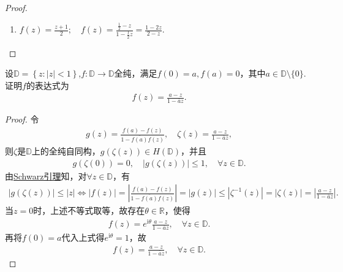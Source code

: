 \documentclass[../../main.tex]{subfiles}%
\begin{document}
\begin{proof}
\begin{enumerate}[(1)]
\item $f\left( z \right) =\frac{z+1}{2};\quad f\left( z \right) =\frac{\frac{1}{2}-z}{1-\frac{1}{2}z}=\frac{1-2z}{2-z}.$
\end{enumerate}

\end{proof}

\begin{example}
设$\mathbb{D} =\left\{ z:\left| z \right|<1 \right\}$,$f:\mathbb{D}\to\mathbb{D}$全纯，满足$f(0)=a,f(a)=0$，其中$a\in\mathbb{D}\setminus\{0\}$. 证明$f$的表达式为
\begin{align*}
f(z)=\frac{a-z}{1-\overline{a}z}.
\end{align*}
\end{example}
\begin{proof}

令
\begin{align*}
g\left( z \right) =\frac{f\left( a \right) -f\left( z \right)}{1-\overline{f\left( a \right) }f\left( z \right)},\quad \zeta \left( z \right) =\frac{a-z}{1-\overline{a}z},
\end{align*}
则$\zeta$是$\mathbb{D}$上的全纯自同构，$g\left( \zeta \left( z \right) \right) \in H\left( \mathbb{D} \right)$，并且
\begin{align*}
g\left( \zeta \left( 0 \right) \right) =0,\quad \left| g\left( \zeta \left( z \right) \right) \right|\leqslant 1,\quad \forall z\in \mathbb{D} .
\end{align*}
由\hyperref[theorem:Schwarz引理-定理4.5.3]{Schwarz引理}知，对$\forall z\in \mathbb{D}$，有
\begin{align*}
\left| g\left( \zeta \left( z \right) \right) \right|\leqslant \left| z \right|\Longleftrightarrow \left| f\left( z \right) \right|=\left| \frac{f\left( a \right) -f\left( z \right)}{1-\overline{f\left( a \right) }f\left( z \right)} \right|=\left| g\left( z \right) \right|\leqslant \left| \zeta ^{-1}\left( z \right) \right|=\left| \zeta \left( z \right) \right|=\left| \frac{a-z}{1-\overline{a}z} \right|.
\end{align*}
当$z=0$时，上述不等式取等，故存在$\theta \in \mathbb{R}$，使得
\begin{align*}
f\left( z \right) =e^{\mathrm{i}\theta}\frac{a-z}{1-\overline{a}z},\quad \forall z\in \mathbb{D} .
\end{align*}
再将$f\left( 0 \right) =a$代入上式得$e^{\mathrm{i}\theta}=1$，故
\begin{align*}
f\left( z \right) =\frac{a-z}{1-\overline{a}z},\quad \forall z\in \mathbb{D} .
\end{align*}

\end{proof}
\end{document}
